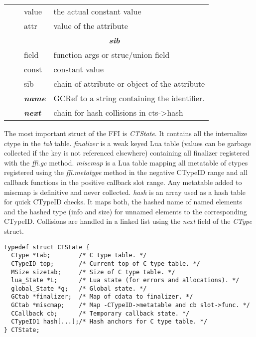 \begin{table}[p]
\begin{tabular}{ll|l|l|}
                             &                & value                  & the actual constant value                          \\
                             &                & attr                   & value of the attribute                             \\ \cline{3-4}
                             &                & \multicolumn{2}{c|}{\textit{\textbf{sib}}}                                  \\ \cline{3-4}
                             &                & field                  & function args or struc/union field                 \\
                             &                & const                  & constant value                                     \\
                             &                & sib                    & chain of attribute or object of the attribute      \\ \cline{3-4}
                             &                & \textit{\textbf{name}} & GCRef to a string containing the identifier.       \\ \cline{3-4}
                             &                & \textit{\textbf{next}} & chain for hash collisions in cts-\textgreater hash \\ \cline{3-4}
\end{tabular}
\end{table}

\noindent
The most important struct of the FFI is \emph{CTState}. It contains
all the internalize ctype in the \emph{tab} table. \emph{finalizer} is a weak
keyed Lua table (values can be garbage collected if the key is not referenced
elsewhere) containing all finalizer registered with the \emph{ffi.gc} method.
\emph{miscmap} is a Lua table mapping all metatable of ctypes registered using
the \emph{ffi.metatype} method in the negative CTypeID range and all callback
functions in the positive callback slot range. Any metatable added to miscmap is
definitive and never collected. \emph{hash} is an array used as a hash table
for quick CTypeID checks. It maps both, the hashed name of named elements and the
hashed type (info and size) for unnamed elements to the corresponding CTypeID.
Collisions are handled in a linked list using the \emph{next} field of the
\emph{CType} struct.

\begin{lstlisting}[style=CStyle]
typedef struct CTState {
  CType *tab;        /* C type table. */
  CTypeID top;       /* Current top of C type table. */
  MSize sizetab;     /* Size of C type table. */
  lua_State *L;      /* Lua state (for errors and allocations). */
  global_State *g;   /* Global state. */
  GCtab *finalizer;  /* Map of cdata to finalizer. */
  GCtab *miscmap;    /* Map -CTypeID->metatable and cb slot->func. */
  CCallback cb;      /* Temporary callback state. */
  CTypeID1 hash[...];/* Hash anchors for C type table. */
} CTState;
\end{lstlisting}

